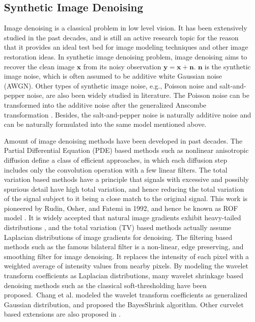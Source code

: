 \subsection{Synthetic Image Denoising}
\label{sec:review:sys}

Image denoising is a classical problem in low level vision. It has been extensively studied in the past decades, and is still an active research topic for the reason that it provides an ideal test bed for image modeling techniques and other image restoration ideas. In synthetic image denoising problem, image denoising aims to recover the clean image $\mathbf{x}$ from its noisy observation $\mathbf{y} = \mathbf{x} + \mathbf{n}$. $\mathbf{n}$ is the synthetic image noise, which is often assumed to be additive white Gaussian noise (AWGN). Other types of synthetic image noise, e.g., Poisson noise and salt-and-pepper noise, are also been widely studied in literature. The Poisson noise can be transformed into the additive noise after the generalized Anscombe transformation \cite{makitalo2013optimal}. Besides, the salt-and-pepper noise is naturally additive noise and can be naturally formulated into the same model mentioned above.

Amount of image denoising methods have been developed in past decades. The Partial Differential Equation (PDE) based methods such as nonlinear anisotropic diffusion \cite{PeronaMalik1990} define a class of efficient approaches, in which each diffusion step includes only the convolution operation with a few linear filters. The total variation based methods \cite{rudin1992nonlinear,osher2005iterative} have a principle that signals with excessive and possibly spurious detail have high total variation, and hence reducing the total variation of the signal subject to it being a close match to the original signal. This work is pioneered by Rudin, Osher, and Fatemi in 1992, and hence be known as ROF model \cite{rudin1992nonlinear}. It is widely accepted that natural image gradients exhibit heavy-tailed distributions \cite{weiss}, and the total variation (TV) based methods \cite{rudin1992nonlinear,osher2005iterative} actually assume Laplacian distributions of image gradients for denoising. The filtering based methods such as the famous bilateral filter \cite{Tomasi1998} is a non-linear, edge preserving, and smoothing filter for image denoising. It replaces the intensity of each pixel with a weighted average of intensity values from nearby pixels. By modeling the wavelet transform coefficients as Laplacian distributions, many wavelet shrinkage based denoising methods such as the classical soft-thresholding \cite{softthresholding} have been proposed.\ Chang et al. modeled the wavelet transform coefficients as generalized Gaussian distribution, and proposed the BayesShrink \cite{bayesshrink} algorithm. Other curvelet based extensions are also proposed in \cite{curvelet}.

